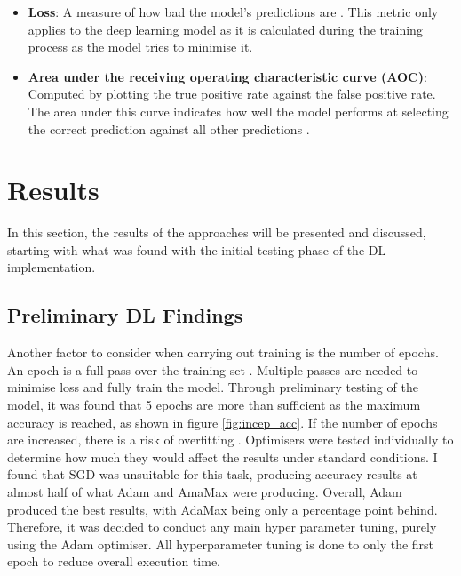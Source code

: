\documentclass[12pt,a4paper]{report}
\begin{document}
\begin{itemize}
    \item \textbf{Loss}: A measure of how bad the model's predictions are \citep{googletrainloss}. 
    This metric only applies to the deep learning model as it is calculated during the training process as the model 
    tries to minimise it.
    \item \textbf{Area under the receiving operating characteristic curve (AOC)}: Computed by plotting the true 
    positive rate against the false positive rate. The area under this curve indicates how well the model performs at selecting 
    the correct prediction against all other predictions \citep{googleroc}.
\end{itemize}

\section{Results}

In this section, the results of the approaches will be presented and discussed, starting with what was found with the
initial testing phase of the DL implementation.

\subsection{Preliminary DL Findings}

Another factor to consider when carrying out training is the number of epochs. An epoch is a full pass over the training
set \citep{epoch}. Multiple passes are needed to minimise loss and fully train the model. Through preliminary testing 
of the model, 
it was found that 5 epochs are more than sufficient as the maximum accuracy is reached, as shown in figure 
\ref{fig:incep_acc}. If
the number of epochs are increased, there is a risk of overfitting \citep{geeksforgeeks}. Optimisers were tested individually to 
determine how much they would affect the results under standard conditions. I found that SGD was unsuitable for this 
task, producing accuracy results at almost half of what Adam and AmaMax were producing. Overall, Adam produced the best 
results, with AdaMax being only a percentage point behind. Therefore, it was decided to conduct any main hyper parameter 
tuning, purely using the Adam optimiser. All hyperparameter tuning is done to only the first epoch to reduce overall 
execution time. 
\end{document}
